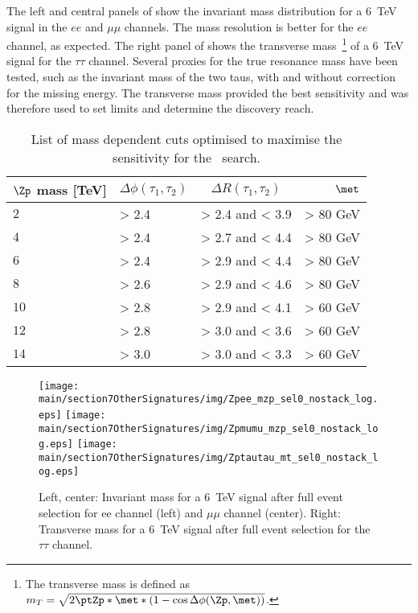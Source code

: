 The left and central panels of  show the invariant mass distribution for a 6~TeV signal in the $ee$ and $\mu\mu$ channels. The mass resolution is better for the $ee$ channel, as expected. The right panel of  shows the transverse mass~\footnote{The transverse mass is defined as $m_{T}  =  \sqrt{2\ptZp*\met*(1-\cos\Delta\phi(\Zp,\met))}$.}
of a 6~TeV signal for the $\tau\tau$ channel.
Several proxies for the true resonance mass have been tested, such as the invariant mass of the two taus, with and without correction for the missing energy. The transverse mass provided the best sensitivity and was therefore used to set limits and determine the discovery reach.

\begin{table}[htbp]
   \centering
\begin{tabular}{l|l|c|r}
   $\Zp$ mass [TeV] &  $\Delta \phi(\tau_1, \tau_2)$&  $\Delta R(\tau_1, \tau_2)$ & $\met$\\
  \hline
   $2$ & > 2.4 & > 2.4 and < 3.9 & > 80 GeV\\
   $4$ & > 2.4 & > 2.7 and < 4.4 & > 80 GeV\\
   $6$ & > 2.4 & > 2.9 and < 4.4 & > 80 GeV\\
   $8$ & > 2.6 & > 2.9 and < 4.6 & > 80 GeV\\
  $10$ & > 2.8 & > 2.9 and < 4.1 & > 60 GeV\\
  $12$ & > 2.8 & > 3.0 and < 3.6 & > 60 GeV\\
  $14$ & > 3.0 & > 3.0 and < 3.3 & > 60 GeV\\
  \end{tabular}
  \caption{List of mass dependent cuts optimised to maximise the sensitivity for the \Zptata\ search.}
  \label{tab:leptonicresonances:selectiontautau}
\end{table}


\begin{figure}[htbp]
  \centering
  \texttt{[image: \\main/section7OtherSignatures/img/Zpee\_mzp\_sel0\_nostack\_log.eps]}
  \texttt{[image: \\main/section7OtherSignatures/img/Zpmumu\_mzp\_sel0\_nostack\_log.eps]}
  \texttt{[image: \\main/section7OtherSignatures/img/Zptautau\_mt\_sel0\_nostack\_log.eps]}
  \caption{Left, center: Invariant mass for a 6~TeV signal after full event selection for ee channel (left) and $\mu\mu$ channel (center). Right: Transverse mass for a 6~TeV signal after full event selection for the $\tau\tau$ channel. }
  \label{fig:leptonicresonances:masses}
\end{figure}


